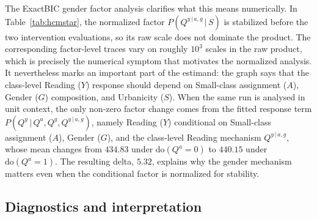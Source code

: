 \documentclass[unnumsec,webpdf,contemporary,large]{oup-authoring-template}%
\theoremstyle{thmstyleone}%
\theoremstyle{thmstyletwo}%
\theoremstyle{thmstylethree}%
\newcommand{\rmdo}{\mathrm{do}}
\newcommand{\g}{\,\vert\,}
\begin{document}
The ExactBIC gender factor analysis clarifies what this means numerically.
In Table~\ref{tab:hcmstar}, the normalized factor $P(Q^{y\g a,g}\g S)$ is stabilized before the two intervention evaluations, so its raw scale does not dominate the product. The corresponding factor-level traces vary on roughly $10^3$ scales in the raw product, which is precisely the numerical symptom that motivates the normalized analysis.
It nevertheless marks an important part of the estimand: the graph says that the class-level Reading ($Y$) response should depend on Small-class assignment ($A$), Gender ($G$) composition, and Urbanicity ($S$).
When the same run is analysed in unit context, the only non-zero factor change comes from the fitted response term $P(Q^y\g Q^a,Q^g,Q^{y\g a,g})$, namely Reading ($Y$) conditional on Small-class assignment ($A$), Gender ($G$), and the class-level Reading mechanism $Q^{y\g a,g}$, whose mean changes from $434.83$ under $\rmdo(Q^a=0)$ to $440.15$ under $\rmdo(Q^a=1)$.
The resulting delta, $5.32$, explains why the gender mechanism matters even when the conditional factor is normalized for stability.

\subsection{Diagnostics and interpretation}
\end{document}
